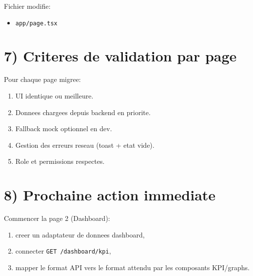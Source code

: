 \documentclass[11pt,a4paper]{article}
\begin{document}
Fichier modifie:
\begin{itemize}[leftmargin=*]
  \item \texttt{app/page.tsx}
\end{itemize}

\section*{7) Criteres de validation par page}
Pour chaque page migree:
\begin{enumerate}[leftmargin=*]
  \item UI identique ou meilleure.
  \item Donnees chargees depuis backend en priorite.
  \item Fallback mock optionnel en dev.
  \item Gestion des erreurs reseau (toast + etat vide).
  \item Role et permissions respectes.
\end{enumerate}

\section*{8) Prochaine action immediate}
Commencer la page 2 (Dashboard):
\begin{enumerate}[leftmargin=*]
  \item creer un adaptateur de donnees dashboard,
  \item connecter \texttt{GET /dashboard/kpi},
  \item mapper le format API vers le format attendu par les composants KPI/graphs.
\end{enumerate}
\end{document}
